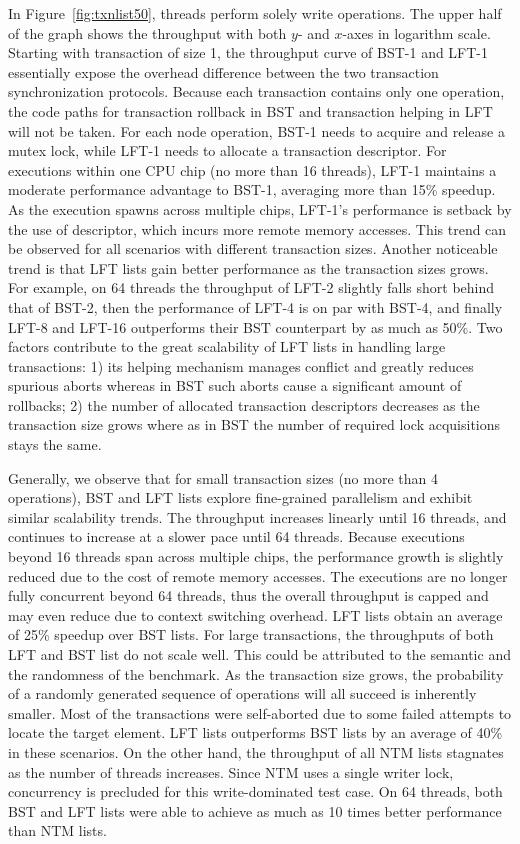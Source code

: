 \documentclass[]{sig-alternate-05-2015}
\begin{document}
In Figure~\ref{fig:txnlist50}, threads perform solely write operations.
The upper half of the graph shows the throughput with both $y$- and $x$-axes in logarithm scale.
Starting with transaction of size 1, the throughput curve of BST-1 and LFT-1 essentially expose the overhead difference between the two transaction synchronization protocols.
Because each transaction contains only one operation, the code paths for transaction rollback in BST and transaction helping in LFT will not be taken.
For each node operation, BST-1 needs to acquire and release a mutex lock, while LFT-1 needs to allocate a transaction descriptor.
For executions within one CPU chip (no more than 16 threads), LFT-1 maintains a moderate performance advantage to BST-1, averaging more than 15\% speedup.
As the execution spawns across multiple chips, LFT-1's performance is setback by the use of descriptor, which incurs more remote memory accesses.
This trend can be observed for all scenarios with different transaction sizes.
Another noticeable trend is that LFT lists gain better performance as the transaction sizes grows.
For example, on 64 threads the throughput of LFT-2 slightly falls short behind that of BST-2, then the performance of LFT-4 is on par with BST-4, and finally LFT-8 and LFT-16 outperforms their BST counterpart by as much as 50\%.
Two factors contribute to the great scalability of LFT lists in handling large transactions: 1) its helping mechanism manages conflict and greatly reduces spurious aborts whereas in BST such aborts cause a significant amount of rollbacks; 2) the number of allocated transaction descriptors decreases as the transaction size grows where as in BST the number of required lock acquisitions stays the same.

Generally, we observe that for small transaction sizes (no more than 4 operations), BST and LFT lists explore fine-grained parallelism and exhibit similar scalability trends.
The throughput increases linearly until 16 threads, and continues to increase at a slower pace until 64 threads.
Because executions beyond 16 threads span across multiple chips, the performance growth is slightly reduced due to the cost of remote memory accesses.
The executions are no longer fully concurrent beyond 64 threads, thus the overall throughput is capped and may even reduce due to context switching overhead.
LFT lists obtain an average of 25\% speedup over BST lists.
For large transactions, the throughputs of both LFT and BST list do not scale well.
This could be attributed to the semantic and the randomness of the benchmark.
As the transaction size grows, the probability of a randomly generated sequence of operations will all succeed is inherently smaller.
Most of the transactions were self-aborted due to some failed attempts to locate the target element.
LFT lists outperforms BST lists by an average of 40\% in these scenarios.
On the other hand, the throughput of all NTM lists stagnates as the number of threads increases.
Since NTM uses a single writer lock, concurrency is precluded for this write-dominated test case.
On 64 threads, both BST and LFT lists were able to achieve as much as 10 times better performance than NTM lists.
\end{document}
